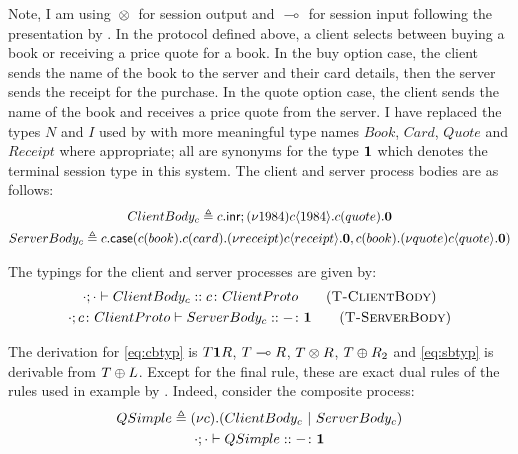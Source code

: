 Note, I am using ${}\otimes{}$ for session output and ${}\multimap{}$ for session
input following the presentation by \citeauthor{Caires:2010:STI}. In the
protocol defined above, a client selects between buying a book or receiving a
price quote for a book. In the buy option case, the client sends the name of
the book to the server and their card details, then the server sends the
receipt for the purchase. In the quote option case, the client sends the name
of the book and receives a price quote from the server. I have replaced the
types $N$ and $I$ used by \citeauthor{Caires:2010:STI} with more meaningful
type names $Book$, $Card$, $Quote$ and $Receipt$ where appropriate; all are
synonyms for the type $\mathbf{1}$ which denotes the terminal session type in this
system. The client and server process bodies are as follows:
\begin{gather*}
{ClientBody_c}\triangleq{{c}.\mathsf{inr};{(\nu{1984}){c}\langle{1984}\rangle.{{c}({quote}).{\mathbf{0}}}}}\\
{ServerBody_c}\triangleq{{c}.\mathsf{case}({{c}({book}).{{c}({card}).{(\nu{receipt}){c}\langle{receipt}\rangle.{\mathbf{0}}}}},{{c}({book}).{(\nu{quote}){c}\langle{quote}\rangle.{\mathbf{0}}}})}
\end{gather*}

\begin{samepage}
The typings for the client and server processes are given by:
\begin{gather*}
\tsequent{\cdot}{\cdot}{ClientBody_c}{\typedid{c}{ClientProto}}
\tag{\mkTrule{ClientBody}} \label{eq:cbtyp}
\\ \tsequent{\cdot}{\typedid{c}{ClientProto}}{ServerBody_c}{\typedid{-}{\1}}
\tag{\mkTrule{ServerBody}} \label{eq:sbtyp}
\end{gather*}
\end{samepage}

The derivation for \eqref{eq:cbtyp} is $T\mathbf{1} R$, ${T}\multimap{R}$, ${T}\otimes{R}$,
${T}\oplus{R_2}$ and \eqref{eq:sbtyp} is derivable from
${T}\oplus{L}$. Except for the final rule, these are exact dual rules of the
rules used in example by \citeauthor{Caires:2010:STI}. Indeed, consider the
composite process:
\begin{gather*}
{QSimple}\triangleq{(\nu{c}).({ClientBody_c}~|~{ServerBody_c})}\\
{\cdot};{\cdot}\vdash{QSimple}::{{-}\colon{\mathbf{1}}}
\end{gather*}


